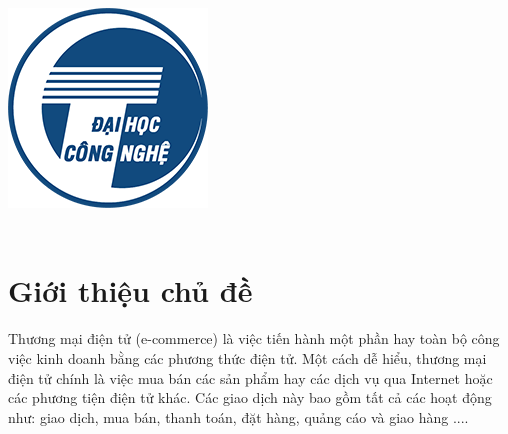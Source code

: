\begin{titlepage}




\includegraphics[scale=0.36]{logo/UET.png}\\[2cm]\\ %
 

\vfill %

\end{titlepage}


\section{Giới thiệu chủ đề}
Thương mại điện tử (e-commerce) là việc tiến hành một phần hay toàn bộ công việc kinh doanh bằng các phương thức điện tử. Một cách dễ hiểu, thương mại điện tử chính là việc mua bán các sản phẩm hay các dịch vụ qua Internet hoặc các phương tiện điện tử khác. Các giao dịch này bao gồm tất cả các hoạt động như: giao dịch, mua bán, thanh toán, đặt hàng, quảng cáo và giao hàng ....


